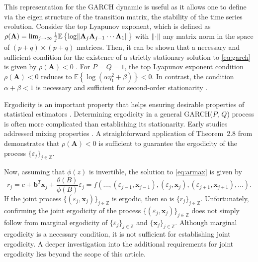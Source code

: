 \documentclass[10pt,a4paper,oneside]{article}
\newcommand{\Z}{\mathbb{Z}}
\newcommand{\E}{\mathbb{E}}
\DeclarePairedDelimiter{\norma}{\lVert}{\rVert} %
\begin{document}
 This representation for the GARCH dynamic is useful as it allows one to define via the eigen structure of the transition matrix, the stability of the time series evolution. Consider the top Lyapunov exponent, which is defined as $\rho(\mathbf{A}) = \lim_{j \rightarrow \infty} \frac{1}{j} \E \left \{  \log\norma{\mathbf{A}_j \mathbf{A}_{j - 1} \cdots \mathbf{A}_1} \right \}$ with $\norma{\cdot}$ any matrix norm in the space of $(p + q) \times (p + q)$ matrices. Then, it can be shown that a necessary and sufficient condition for the existence of a strictly stationary solution to \eqref{eq:garch} is given by $\rho(\mathbf{A}) < 0$ \citep[thm.~2.4.]{francq2019garch}. For $P = Q = 1$, the top Lyapunov exponent condition $\rho(\mathbf{A}) < 0$ reduces to $\E \left\{ \log \left( \alpha \eta_1^2 + \beta \right) \right\} < 0$. In contrast, the condition $\alpha + \beta < 1$ is necessary and sufficient for second-order stationarity \citep[thm.~2.5.]{francq2019garch}.

Ergodicity is an important property that helps ensuring desirable properties of statistical estimators \citep[see~p.~367]{francq2019garch}. Determining ergodicity in a general GARCH(\(P\), \(Q\)) process is often more complicated than establishing its stationarity. Early studies addressed mixing properties \cite{boussama1998ergodicite, carrasco2002mixing}. A straightforward application of Theorem~2.8 from \cite{straumann_quasi-maximum-likelihood_2006} demonstrates that \(\rho(\mathbf{A}) < 0\) is sufficient to guarantee the ergodicity of the process \(\{\varepsilon_j\}_{j \in \mathbb{Z}}\).

Now, assuming that $\phi(z)$ is invertible, the solution to \eqref{eq:armax} is given by
$$
    r_j = c +  \mathbf{b}^T \mathbf{x}_j + \frac{\theta(B)}{\phi(B)} \varepsilon_j = f(\dots, (\varepsilon_{j - 1}, \mathbf{x}_{j - 1}), (\varepsilon_{j}, \mathbf{x}_{j}), (\varepsilon_{j + 1}, \mathbf{x}_{j + 1}), \dots).
$$
If the joint process $\{ (\varepsilon_j, \mathbf{x}_j) \}_{j \in \Z}$ is ergodic, then so is $\{ r_j \}_{j \in \Z}$. Unfortunately, confirming the joint ergodicity of the process \(\{(\varepsilon_j, \mathbf{x}_j)\}_{j \in \mathbb{Z}}\) does not simply follow from marginal ergodicity of \(\{\varepsilon_j\}_{j \in \mathbb{Z}}\) and \(\{\mathbf{x}_j\}_{j \in \mathbb{Z}}\). Although marginal ergodicity is a necessary condition, it is not sufficient for establishing joint ergodicity. A deeper investigation into the additional requirements for joint ergodicity lies beyond the scope of this article.
\end{document}
